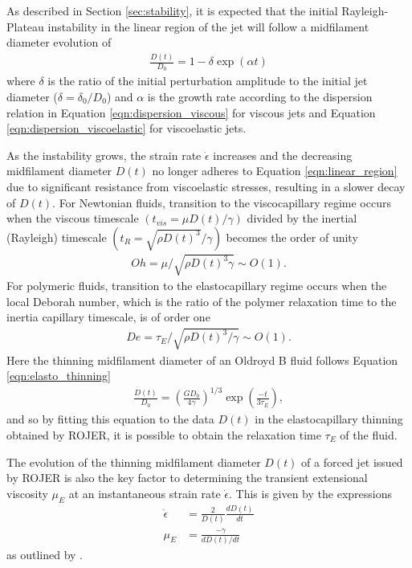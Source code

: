 \documentclass[11pt]{article}
\newcommand{\od}[2]{\frac{d #1}{d #2}}
\begin{document}
As described in Section \ref{sec:stability}, it is expected that the initial Rayleigh-Plateau instability in the linear region of the jet will follow a midfilament diameter evolution of
\begin{align}
\frac{D(t)}{D_0} = 1 - \delta \exp (\alpha t)
\label{eqn:linear_region}
\end{align}
where $\delta$ is the ratio of the initial perturbation amplitude to the initial jet diameter ($\delta = \delta_0 / D_0$) and $\alpha$ is the growth rate according to the dispersion relation in Equation \ref{eqn:dispersion_viscous} for viscous jets and Equation \ref{eqn:dispersion_viscoelastic} for viscoelastic jets.

As the instability grows, the strain rate $\dot{\epsilon}$ increases and the decreasing midfilament diameter $D(t)$ no longer adheres to Equation \ref{eqn:linear_region} due to significant resistance from viscoelastic stresses, resulting in a slower decay of $D(t)$. For Newtonian fluids, transition to the viscocapillary regime occurs when the viscous timescale $\left(t_{vis} = \mu D(t) /\gamma \right)$ divided by the inertial (Rayleigh) timescale $\left(t_R = \sqrt{\rho D(t)^3}/\gamma \right)$ becomes the order of unity \citep{clasen2012dispensing}
\begin{align*}
Oh = \mu/\sqrt{\rho D(t)^3 \gamma} \sim O(1).
\end{align*}
For polymeric fluids, transition to the elastocapillary regime occurs when the local Deborah number, which is the ratio of the polymer relaxation time to the inertia capillary timescale, is of order one 
\begin{align*}
De = \tau_E / \sqrt{\rho D(t)^3/\gamma} \sim O(1).
\end{align*}
Here the thinning midfilament diameter of an Oldroyd B fluid follows Equation \ref{eqn:elasto_thinning}
\begin{align}
\frac{D(t)}{D_0} = \left(\frac{G D_0}{4 \gamma}\right)^{1/3} \exp \left(\frac{-t}{3 \tau_E}\right),
\label{eqn:elasto_thinning4}
\end{align}
and so by fitting this equation to the data $D(t)$ in the elastocapillary thinning obtained by ROJER, it is possible to obtain the relaxation time $\tau_E$ of the fluid.

The evolution of the thinning midfilament diameter $D(t)$ of a forced jet issued by ROJER is also the key factor to determining the transient extensional viscosity $\mu_E$ at an instantaneous strain rate $\dot{\epsilon}$. This is given by the expressions
\begin{align}
\dot{\epsilon} &= \frac{2}{D(t)} \od{D(t)}{t} \label{eqn:strain_rate} \\
\mu_E &= \frac{- \gamma}{d D(t) / dt} \label{eqn:ext_viscosity}
\end{align}
as outlined by \cite{anna2001elasto}.
\end{document}
